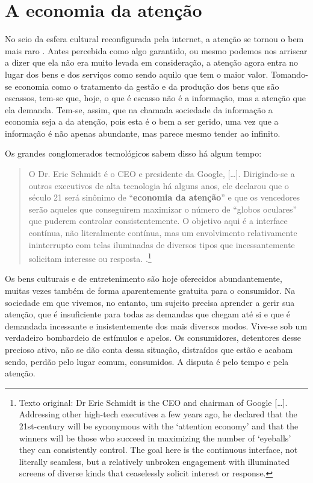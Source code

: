 \section{A economia da atenção}\label{sec-aeconomiadaatenção}

No seio da esfera cultural reconfigurada pela internet, a atenção se tornou o bem mais raro \cite{citton2013}. Antes percebida como algo garantido, ou mesmo podemos nos arriscar a dizer que ela não era muito levada em consideração, a atenção agora entra no lugar dos bens e dos serviços como sendo aquilo que tem o maior valor. Tomando-se economia como o tratamento da gestão e da produção dos bens que são escassos, tem-se que, hoje, o que é escasso não é a informação, mas a atenção que ela demanda. Tem-se, assim, que na chamada sociedade da informação a economia seja a da atenção, pois esta é o bem a ser gerido, uma vez que a informação é não apenas abundante, mas parece mesmo tender ao infinito. 

Os grandes conglomerados tecnológicos sabem disso há algum tempo:

\begin{quote}
O Dr. Eric Schmidt é o CEO e presidente da Google, [\ldots]. Dirigindo-se a outros executivos de alta tecnologia há alguns anos, ele declarou que o século 21 será sinônimo de \enquote{\textbf{economia da atenção}} e que os vencedores serão aqueles que conseguirem maximizar o número de \enquote{globos oculares} que puderem controlar consistentemente. O objetivo aqui é a interface contínua, não literalmente contínua, mas um envolvimento relativamente ininterrupto com telas iluminadas de diversos tipos que incessantemente solicitam interesse ou resposta. \cite[s/p tradução e negrito nossos]{crary}.\footnote{Texto original: Dr Eric Schmidt is the CEO and chairman of Google [\ldots]. Addressing other high-tech executives a few years ago, he declared that the 21st-century will be synonymous with the ‘attention economy’ and that the winners will be those who succeed in maximizing the number of ‘eyeballs’ they can consistently control. The goal here is the continuous interface, not literally seamless, but a relatively unbroken engagement with illuminated screens of diverse kinds that ceaselessly solicit interest or response.}

\end{quote}

Os bens culturais e de entretenimento são hoje oferecidos abundantemente, muitas vezes também de forma aparentemente gratuita para o consumidor. Na sociedade em que vivemos, no entanto, um sujeito precisa aprender a gerir sua atenção, que é insuficiente para todas as demandas que chegam até si e que é demandada incessante e insistentemente dos mais diversos modos. Vive-se sob um verdadeiro bombardeio de estímulos e apelos. Os consumidores, detentores desse precioso ativo, não se dão conta dessa situação, distraídos que estão e acabam sendo, perdão pelo lugar comum, consumidos. A disputa é pelo tempo e pela atenção.

